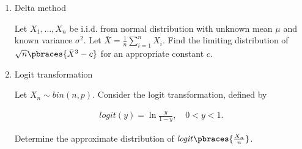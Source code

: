 
\begin{exercise}

\phantom{}

\begin{enumerate}[label = (\alph*)]

    \item Delta method
    
    Let $X_1, \dots, X_n$ be i.i.d. from normal distribution with unknown mean $\mu$ and known variance $\sigma^2$.
    Let $\bar X = \frac{1}{n} \sum_{i=1}^n X_i$.
    Find the limiting distribution of $\sqrt n \pbraces{\bar X^3 - c}$ for an appropriate constant $c$.

    \item Logit transformation
    
    Let $X_n \sim \mathit{bin}(n, p)$.
    Consider the logit transformation, defined by

    \begin{align*}
        \mathit{logit}(y)
        =
        \ln \frac{y}{1 - y},
        \quad
        0 < y < 1.
    \end{align*}

    Determine the approximate distribution of $\mathit{logit} \pbraces{\frac{X_n}{n}}$.

\end{enumerate}

\end{exercise}


